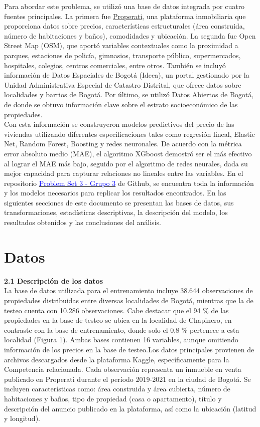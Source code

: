 \documentclass[a4paper]{article}
\theoremstyle{remark}
\theoremstyle{definition}
\begin{document}
Para abordar este problema, se utilizó una base de datos integrada por cuatro fuentes principales. La primera fue \href{https://www.properati.com.co/}{Properati}, una plataforma inmobiliaria que proporciona datos sobre precios, características estructurales (área construida, número de habitaciones y baños), comodidades y ubicación. La segunda fue Open Street Map (OSM), que aportó variables contextuales como la proximidad a parques, estaciones de policía, gimnasios, transporte público, supermercados, hospitales, colegios, centros comerciales, entre otros. También se incluyó información de Datos Espaciales de Bogotá (Ideca), un portal gestionado por la Unidad Administrativa Especial de Catastro Distrital, que ofrece datos sobre localidades y barrios de Bogotá. Por último, se utilizó Datos Abiertos de Bogotá, de donde se obtuvo información clave sobre el estrato socioeconómico de las propiedades.\\

Con esta información se construyeron modelos predictivos del precio de las viviendas utilizando diferentes especificaciones tales como regresión lineal, Elastic Net, Random Forest, Boosting y redes neuronales. De acuerdo con la métrica error absoluto medio (MAE), el algoritmo XGboost demostró ser el más efectivo al lograr el MAE más bajo, seguido por el algoritmo de redes neurales, dada su mejor capacidad para capturar relaciones no lineales entre las variables. En el repositorio \href{https://github.com/stevrss/Problem-Set-3-Machine-Learning_2024.git}{\textcolor{blue}{Problem Set 3 - Grupo 3}} de Github, se encuentra toda la información y los modelos necesarios para replicar los resultados encontrados. En las siguientes secciones de este documento se presentan las bases de datos, sus transformaciones, estadísticas descriptivas, la descripción del modelo, los resultados obtenidos y las conclusiones del análisis.

\section{Datos}

\textbf{2.1 Descripción de los datos} \\

La base de datos utilizada para el entrenamiento incluye 38.644 observaciones de propiedades distribuidas entre diversas localidades de Bogotá, mientras que la de testeo cuenta con 10.286 observaciones. Cabe destacar que el 94 
\% de las propiedades en la base de testeo se ubica en la localidad de Chapinero, en contraste con la base de entrenamiento, donde solo el 0,8 \% pertenece a esta localidad (Figura 1). Ambas bases contienen 16 variables, aunque omitiendo información de los precios en la base de testeo.Los datos principales provienen de archivos descargados desde la plataforma Kaggle, específicamente para la Competencia relacionada. Cada observación representa un inmueble en venta publicado en Properati durante el período 2019-2021 en la ciudad de Bogotá. Se incluyen características como: área construida y área cubierta, número de habitaciones y baños, tipo de propiedad (casa o apartamento), título y descripción del anuncio publicado en la plataforma, así como la ubicación (latitud y longitud).\\
\end{document}
